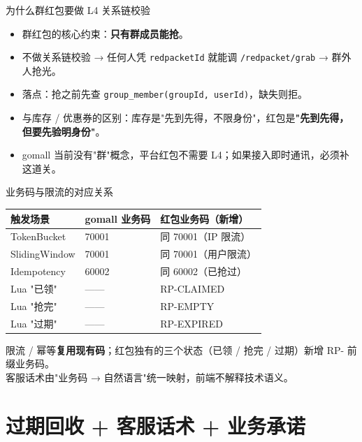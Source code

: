 \begin{frame}{为什么群红包要做 L4 关系链校验}
\begin{itemize}
  \item 群红包的核心约束：\textbf{只有群成员能抢}。
  \item 不做关系链校验 → 任何人凭 \texttt{redpacketId} 就能调 \texttt{/redpacket/grab} → 群外人抢光。
  \item 落点：抢之前先查 \texttt{group\_member(groupId, userId)}，缺失则拒。
  \item 与库存 / 优惠券的区别：库存是"先到先得，不限身份"，红包是\textbf{"先到先得，但要先验明身份"}。
  \item gomall 当前没有"群"概念，平台红包不需要 L4；如果接入即时通讯，必须补这道关。
\end{itemize}
\end{frame}

\begin{frame}{业务码与限流的对应关系}
\begin{tabular}{@{}lll@{}}
\toprule
触发场景       & gomall 业务码 & 红包业务码（新增）     \\
\midrule
TokenBucket    & 70001         & 同 70001（IP 限流）    \\
SlidingWindow  & 70001         & 同 70001（用户限流）   \\
Idempotency    & 60002         & 同 60002（已抢过）     \\
Lua "已领"     & ——            & RP-CLAIMED            \\
Lua "抢完"     & ——            & RP-EMPTY              \\
Lua "过期"     & ——            & RP-EXPIRED            \\
\bottomrule
\end{tabular}
\vspace{2mm}
\small 限流 / 幂等\textbf{复用现有码}；红包独有的三个状态（已领 / 抢完 / 过期）新增 RP- 前缀业务码。\\
客服话术由"业务码 → 自然语言"统一映射，前端不解释技术语义。
\end{frame}

\section{过期回收 + 客服话术 + 业务承诺}


